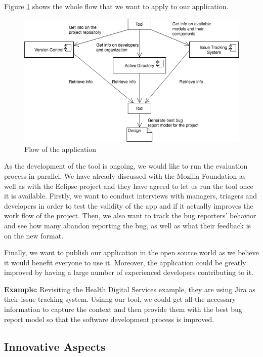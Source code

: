 \documentclass[11pt,english,twocolumn]{article}
\begin{document}
Figure \ref{diagram} shows the whole flow that we want 
to apply to our application.

\begin{figure}
	\centering
	\includegraphics[width=\linewidth]{diagram}
	\caption{Flow of the application}
	\label{diagram}
\end{figure}

As the development of the tool is ongoing, we would like to run the evaluation process in
parallel. We have already discussed with the Mozilla Foundation as well as with the Eclipse
project and they have agreed to let us run the tool once it is available. Firstly, we want to 
conduct interviews with managers, triagers and developers in order to test the validity of
the app and if it actually improves the work flow of the project. Then, we also want to track 
the bug reporters' behavior and see how many abandon reporting the bug, as well as what their
feedback is on the new format.

Finally, we want to publish our application in the open source world as we believe it would
benefit everyone to use it. Moreover, the application could be greatly improved by having 
a large number of experienced developers contributing to it.

\textbf{Example:} Revisiting the Health Digital Services example, they are using Jira as their
issue tracking system. Usinng our tool, we could get all the necessary information to capture
the context and then provide them with the best bug report model so that the software 
development process is improved.

\subsection*{Innovative Aspects}
\end{document}
